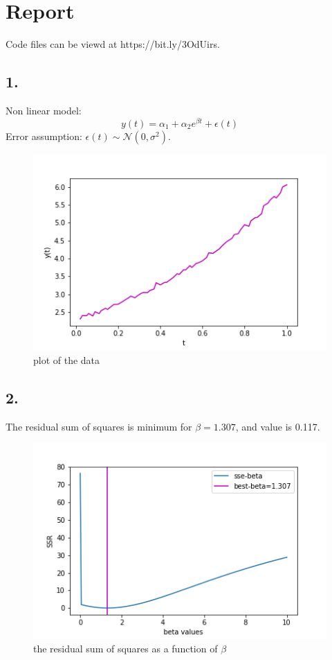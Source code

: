 \documentclass{article}
\begin{document}
\section*{Report}
Code files can be viewd at https://bit.ly/3OdUirs.
\subsection*{1.}
Non linear model:
\begin{equation*}
    y(t)=\alpha_1+\alpha_2e^{\beta t} +\epsilon(t)
\end{equation*} 
Error assumption: $\epsilon(t) \sim \mathcal{N}(0,\sigma^2)$.

\begin{figure}[H]
    \includegraphics[]{plots/q1.png}
    \caption{plot of the data}
\end{figure}
\subsection*{2.}
The residual sum of squares is minimum for $\beta=1.307$, and value is 0.117.
\begin{figure}[H]
    \includegraphics[]{plots/q2.png}
    \caption{the residual sum of squares as a function of $\beta$}
\end{figure}
\end{document}
